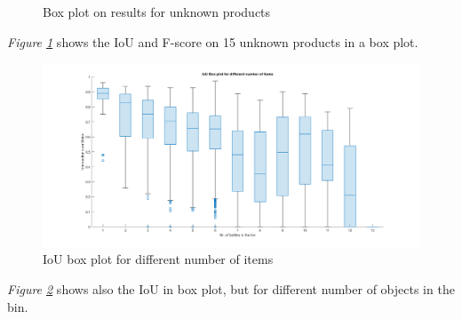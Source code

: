 \begin{figure}[h]
    \centering
    \hfill
    
    \caption{Box plot on results for unknown products}
    \label{fig:unknowniou}
\end{figure}

\textit{Figure \ref{fig:unknowniou}} shows the IoU and F-score on 15 unknown products in a box plot.
\begin{figure}[h]
    \centering
    \includegraphics[width=1\textwidth]{graphics/results/boxplotBottles.png}
    \caption{IoU box plot for different number of items}
    \label{fig:bottles}
\end{figure}

\textit{Figure \ref{fig:bottles}} shows also the IoU in box plot, but for different number of objects in the bin.